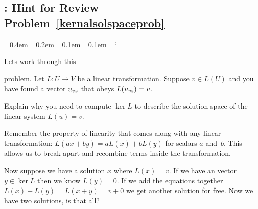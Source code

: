 
\subsection*{\leastSquaresTitle: Hint for Review Problem~\ref{kernalsolspaceprob}}

{\ttfamily
{}\font=0.4em
\font=0.2em
\font=0.1em
\font=0.1em
\hyphenchar\font=`\-


\hypertarget{scripts_least_squares_hint}{Lets work through this} problem. 
 Let $L:U\rightarrow V$ be a linear transformation.  Suppose $v\in L(U)$ and you have found a vector $u_{\rm ps}$ that obeys $L(u_{\rm ps})=v$.

Explain why you need to compute $\ker L$ to describe the solution space of the linear system $L(u)=v$.

Remember the property of linearity that comes along with any linear transformation: $L(ax+by) = aL(x) + bL(y)$ for scalars $a$ and~$b$. This allows us to break apart and recombine terms inside the transformation.

Now suppose we have a solution $x$ where $L(x)=v$. If we have an vector $y \in \ker{L}$ then we know $L(y)=0$. If we add the equations together $L(x)+  L(y) = L(x+ y)=v +0$ we get another solution for free. Now we have two solutions, is that all?



} %

